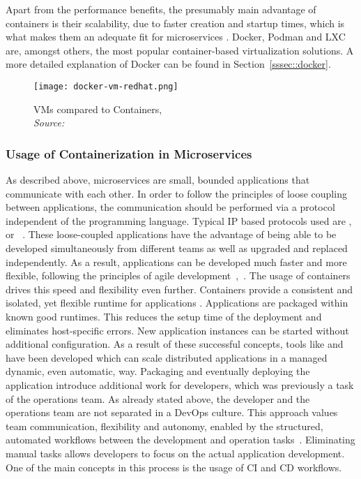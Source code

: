         Apart from the performance benefits, the presumably main advantage of containers is their scalability, due to faster creation and startup times, which is what makes them an adequate fit for microservices \cite{cintainer_scale}. Docker, Podman and LXC are, amongst others, the most popular container-based virtualization solutions. A more detailed explanation of Docker can be found in Section~\ref{sssec::docker}.

        \begin{figure}
            \centering
            \texttt{[image: docker-vm-redhat.png]}
            \caption{\ac{VM}s compared to Containers, \\\textit{Source:~\cite{redhat_pic}}}\label{fig::vm_docker}
        \end{figure}

        \subsubsection{Usage of Containerization in Microservices}
        As described above, microservices are small, bounded applications that communicate with each other. In order to follow the principles of loose coupling between applications, the communication should be performed via a protocol independent of the programming language. Typical IP based protocols used are ,  or ~\cite{micro}. These loose-coupled applications have the advantage of being able to be developed simultaneously from different teams as well as upgraded and replaced independently. As a result, applications can be developed much faster and more flexible, following the principles of agile development~\cite{micro},~\cite{redhat_micro}.\newline
        The usage of containers drives this speed and flexibility even further. Containers provide a consistent and  isolated, yet flexible runtime for applications \cite{micro_container}. Applications are packaged within known good runtimes. This reduces the setup time of the deployment and eliminates host-specific errors. New application instances can be started without additional configuration. As a result of these successful concepts, tools like  and  have been developed which can scale distributed applications in a managed dynamic, even automatic, way.\newline
        Packaging and eventually deploying the application introduce additional work for developers, which was previously a task of the operations team. As already stated above, the developer and the operations team are not separated in a DevOps culture. This approach values team communication, flexibility and autonomy, enabled by the structured, automated workflows between the development and operation tasks~\cite{effective_devops}. Eliminating manual tasks allows developers to focus on the actual application development. One of the main concepts in this process is the usage of \ac{CI} and \ac{CD} workflows.

